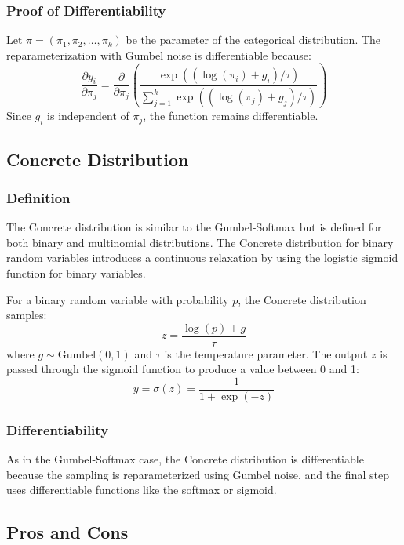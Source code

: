 \documentclass{article}
\begin{document}
\subsubsection{Proof of Differentiability}

Let \( \pi = (\pi_1, \pi_2, \dots, \pi_k) \) be the parameter of the categorical distribution. The reparameterization with Gumbel noise is differentiable because:
\[
\frac{\partial y_i}{\partial \pi_j} = \frac{\partial}{\partial \pi_j} \left( \frac{\exp((\log(\pi_i) + g_i) / \tau)}{\sum_{j=1}^{k} \exp((\log(\pi_j) + g_j) / \tau)} \right)
\]
Since \( g_i \) is independent of \( \pi_j \), the function remains differentiable.

\subsection{Concrete Distribution}

\subsubsection{Definition}

The Concrete distribution is similar to the Gumbel-Softmax but is defined for both binary and multinomial distributions. The Concrete distribution for binary random variables introduces a continuous relaxation by using the logistic sigmoid function for binary variables.

For a binary random variable with probability \( p \), the Concrete distribution samples:
\[
z = \frac{\log(p) + g}{\tau}
\]
where \( g \sim \text{Gumbel}(0, 1) \) and \( \tau \) is the temperature parameter. The output \( z \) is passed through the sigmoid function to produce a value between 0 and 1:
\[
y = \sigma(z) = \frac{1}{1 + \exp(-z)}
\]

\subsubsection{Differentiability}

As in the Gumbel-Softmax case, the Concrete distribution is differentiable because the sampling is reparameterized using Gumbel noise, and the final step uses differentiable functions like the softmax or sigmoid.

\subsection{Pros and Cons}
\end{document}

